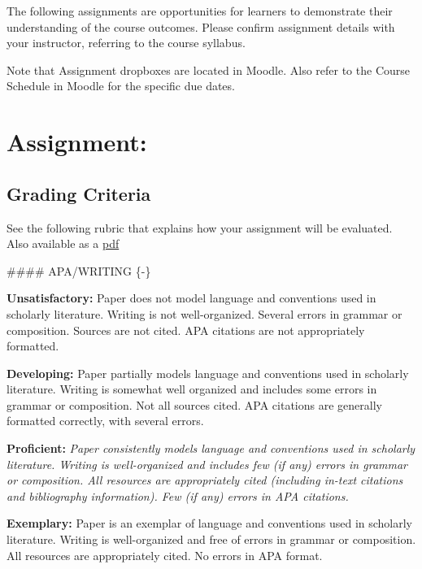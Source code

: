 \documentclass[
]{book}
\begin{document}
The following assignments are opportunities for learners to demonstrate their understanding of the course outcomes. Please confirm assignment details with your instructor, referring to the course syllabus.

Note that Assignment dropboxes are located in Moodle. Also refer to the Course Schedule in Moodle for the specific due dates.

\hypertarget{assignment}{%
\section*{Assignment:}\label{assignment}}

\begin{assessment}

\end{assessment}

\hypertarget{grading-criteria-2}{%
\subsection*{Grading Criteria}\label{grading-criteria-2}}

See the following rubric that explains how your assignment will be evaluated. Also available as a \href{assets/assessment/Identity-as-a-Teacher-RUBRIC.pdf}{pdf}

\#\#\#\# APA/WRITING \{-\}

\textbf{Unsatisfactory:} Paper does not model language and conventions used in scholarly literature. Writing is not well-organized. Several errors in grammar or composition. Sources are not cited. APA citations are not appropriately formatted.

\textbf{Developing:} Paper partially models language and conventions used in scholarly literature. Writing is somewhat well organized and includes some errors in grammar or composition. Not all sources cited. APA citations are generally formatted correctly, with several errors.

\textbf{Proficient:} \emph{Paper consistently models language and conventions used in scholarly literature. Writing is well-organized and includes few (if any) errors in grammar or composition. All resources are appropriately cited (including in-text citations and bibliography information). Few (if any) errors in APA citations.}

\textbf{Exemplary:} Paper is an exemplar of language and conventions used in scholarly literature. Writing is well-organized and free of errors in grammar or composition. All resources are appropriately cited. No errors in APA format.
\end{document}
